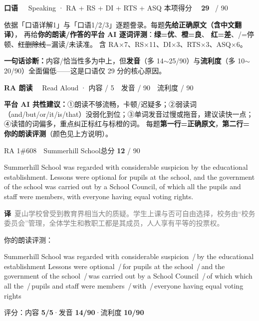 \documentclass[11pt]{article}
\newcommand{\sfull}[1]{\textcolor{cFix}{\bfseries #1}}     %
\newcommand{\spart}[1]{\textcolor{cPartial}{\bfseries #1}} %
\newcommand{\szero}[1]{\textcolor{cWrong}{\bfseries #1}}   %
\newcommand{\ptesection}[3]{%
  \needspace{6\baselineskip}
  \begin{tcolorbox}[enhanced, colback=cAccent, colframe=cAccent, sharp corners,
     left=14pt, right=14pt, top=10pt, bottom=10pt, boxrule=0pt]
    {\fontsize{20}{24}\selectfont\bfseries\color{white} #1\ \ }%
    {\large\color{white!85} #2}\hfill
    {\large\color{white}本项得分\ \ }{\fontsize{22}{24}\selectfont\bfseries\color{white} #3}%
    \ {\color{white!85}/ 90}
  \end{tcolorbox}}
\newcommand{\ptetask}[2]{%
  \needspace{4\baselineskip}\medskip
  \begin{tcolorbox}[enhanced, colback=cHead, colframe=cHead, sharp corners,
     left=12pt, right=12pt, top=5pt, bottom=5pt, boxrule=0pt]
    {\large\bfseries\color{white} #1}\ \ {\color{white!80} #2}
  \end{tcolorbox}\smallskip}
\newcommand{\sg}[1]{\textcolor{cSpkGood}{#1}}   %
\newcommand{\sy}[1]{\textcolor{cSpkOk}{#1}}     %
\newcommand{\pse}{{\color{gray}\,/\,}}          %
\begin{document}
\ptesection{口语}{Speaking · RA + RS + DI + RTS + ASQ}{29}

\vspace{1mm}
{\small\color{gray} 依据「口语详解1」与「口语1/2/3」逐题誊录。每题\textbf{先给正确原文（含中文翻译）}，
再给\textbf{你的朗读/作答的平台 AI 逐词评测}：{\color{cSpkGood}\textbf{绿=优}}、{\color{cSpkOk}\textbf{橙=良}}、
{\color{cSpkBad}\textbf{红=差}}、{\color{gray}/=停顿}、{\color{cSpkBad}\sout{红删除线}}=漏读/未读准。
含 RA$\times$7、RS$\times$11、DI$\times$3、RTS$\times$3、ASQ$\times$6。}
\vspace{1mm}

\begin{notebox}
{\footnotesize \textbf{一句话诊断：}内容/恰当性多为中上，但\textbf{发音}（多 14$\sim$25/90）与\textbf{流利度}（多 10$\sim$20/90）全面偏低——这是口语仅 29 分的核心原因。}
\end{notebox}

\newcommand{\zh}[1]{{\footnotesize\textcolor{cNote}{\textbf{译}}\ \textcolor{gray}{#1}}}

\ptetask{RA 朗读}{Read Aloud · 内容 / 5　发音 / 90　流利度 / 90}

\begin{notebox}
{\footnotesize\textbf{平台 AI 共性建议：}①朗读不够流畅，卡顿/迟疑多；②弱读词（and/but/or/it/is/that）没弱化到位；③单词发音过慢或拖音，建议读快一点；④读错的词偏多，重点纠正{\color{cSpkBad}标红}与{\color{cSpkOk}标橙}的词。
\quad 每题\textbf{第一行=正确原文}，\textbf{第二行=你的朗读评测}（颜色见上方说明）。}
\end{notebox}

\begin{qblock}{RA 1\quad \#608\ \ Summerhill School}{总分 \textcolor{cAccent}{\bfseries 12} / 90}
\begin{promptbox}
Summerhill School was regarded with considerable suspicion by the educational establishment. Lessons were optional for pupils at the school, and the government of the school was carried out by a School Council, of which all the pupils and staff were members, with everyone having equal voting rights.
\end{promptbox}
\zh{夏山学校曾受到教育界相当大的质疑。学生上课与否可自由选择，校务由“校务委员会”管理，全体学生和教职工都是其成员，人人享有平等的投票权。}
\smallskip\par{\footnotesize\color{gray}你的朗读评测：}
\begin{asrbox}
\sg{Summerhill School} \sg{was regarded with considerable suspicion} \pse \sg{by the educational establishment} \sy{Lessons} \sy{were optional} \pse \sy{for} \sg{pupils at the school} \pse \sg{and the government} \sg{of the school} \pse \sg{was carried out by a School Council} \pse \sy{of which which all the} \pse \sy{pupils} \sg{and staff were members} \pse \sg{with} \pse \sg{everyone having equal voting rights}
\end{asrbox}
{\small 评分：内容 \sfull{5/5}\quad·\quad 发音 \spart{14/90}\quad·\quad 流利度 \szero{10/90}}
\end{qblock}
\end{document}
